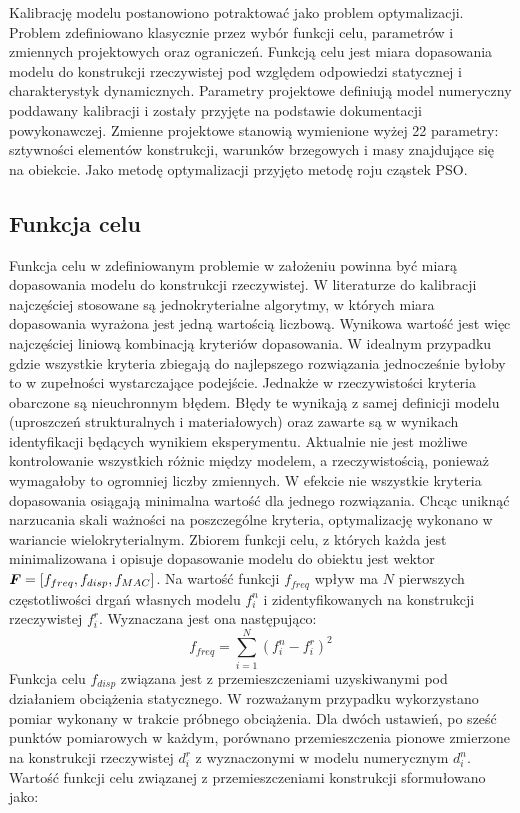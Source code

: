 Kalibrację modelu postanowiono potraktować jako problem optymalizacji. Problem zdefiniowano klasycznie przez wybór funkcji celu, parametrów i zmiennych projektowych oraz ograniczeń. Funkcją celu jest miara dopasowania modelu do konstrukcji rzeczywistej pod względem odpowiedzi statycznej i charakterystyk dynamicznych. Parametry projektowe definiują model numeryczny poddawany kalibracji i zostały przyjęte na podstawie dokumentacji powykonawczej. Zmienne projektowe stanowią wymienione wyżej 22 parametry: sztywności elementów konstrukcji, warunków brzegowych i masy znajdujące się na obiekcie.  Jako metodę optymalizacji przyjęto metodę roju cząstek PSO. 

\subsection{Funkcja celu}
Funkcja celu w zdefiniowanym problemie w założeniu powinna być miarą dopasowania modelu do konstrukcji rzeczywistej. W literaturze do kalibracji najczęściej stosowane są jednokryterialne algorytmy, w których miara dopasowania wyrażona jest jedną wartością liczbową. Wynikowa wartość jest więc najczęściej liniową kombinacją kryteriów dopasowania. W idealnym przypadku gdzie wszystkie kryteria zbiegają do najlepszego rozwiązania jednocześnie byłoby to w zupełności wystarczające podejście. Jednakże w rzeczywistości kryteria obarczone są nieuchronnym błędem. Błędy te wynikają z samej definicji modelu (uproszczeń strukturalnych i materiałowych) oraz zawarte są w wynikach identyfikacji będących wynikiem eksperymentu. Aktualnie nie jest możliwe kontrolowanie wszystkich różnic między modelem, a rzeczywistością, ponieważ wymagałoby to ogromniej liczby zmiennych. W efekcie nie wszystkie kryteria dopasowania osiągają minimalna wartość dla jednego rozwiązania. Chcąc uniknąć narzucania skali ważności na poszczególne kryteria, optymalizację wykonano w wariancie wielokryterialnym. Zbiorem funkcji celu, z których każda jest minimalizowana i opisuje dopasowanie modelu do obiektu jest wektor $\bm{F}=[f_{freq},f_{disp},f_{MAC}]$. Na wartość funkcji $f_{freq}$ wpływ ma $N$ pierwszych częstotliwości drgań własnych modelu $f_i^n$ i zidentyfikowanych na konstrukcji rzeczywistej $f_i^r$. Wyznaczana jest ona następująco:
\begin{equation} \label{eq:wk2_calib_f_freq}
f_{freq}=\sum_{i=1}^{N} (f_i^n - f_i^r)^2
\end{equation}
Funkcja celu $f_{disp}$ związana jest z przemieszczeniami uzyskiwanymi pod działaniem obciążenia statycznego. W rozważanym przypadku wykorzystano pomiar wykonany w trakcie próbnego obciążenia. Dla dwóch ustawień, po sześć punktów pomiarowych w każdym, porównano przemieszczenia pionowe zmierzone na konstrukcji rzeczywistej $d_i^r$ z wyznaczonymi w modelu numerycznym $d_i^n$. Wartość funkcji celu związanej z przemieszczeniami konstrukcji sformułowano jako:
